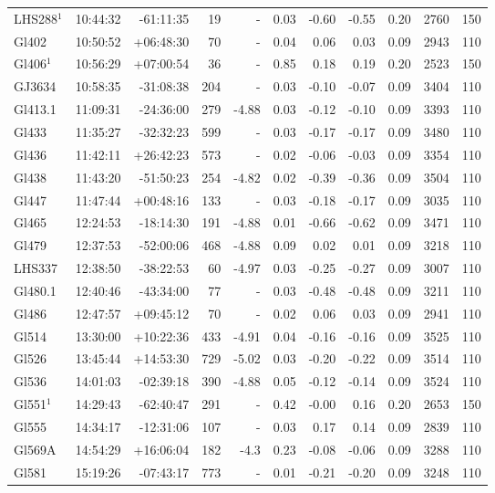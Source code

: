 \documentclass{aa}
\begin{document}
{\begin{longtable}{l r r r r r r r r r r}
LHS288$^1$ & 10:44:32 & -61:11:35 & 19 &    - & 0.03 & -0.60 & -0.55 & 0.20 & 2760 &  150 \\
Gl402 & 10:50:52 & +06:48:30 & 70 &    - & 0.04 & 0.06 & 0.03 & 0.09 & 2943 &  110 \\
Gl406$^1$ & 10:56:29 & +07:00:54 & 36 &    - & 0.85 & 0.18 & 0.19 & 0.20 & 2523 &  150 \\
GJ3634 & 10:58:35 & -31:08:38 & 204 &    - & 0.03 & -0.10 & -0.07 & 0.09 & 3404 &  110 \\
Gl413.1 & 11:09:31 & -24:36:00 & 279 & -4.88 & 0.03 & -0.12 & -0.10 & 0.09 & 3393 &  110 \\
Gl433 & 11:35:27 & -32:32:23 & 599 &    - & 0.03 & -0.17 & -0.17 & 0.09 & 3480 &  110 \\
Gl436 & 11:42:11 & +26:42:23 & 573 &    - & 0.02 & -0.06 & -0.03 & 0.09 & 3354 &  110 \\
Gl438 & 11:43:20 & -51:50:23 & 254 & -4.82 & 0.02 & -0.39 & -0.36 & 0.09 & 3504 &  110 \\
Gl447 & 11:47:44 & +00:48:16 & 133 &    - & 0.03 & -0.18 & -0.17 & 0.09 & 3035 &  110 \\
Gl465 & 12:24:53 & -18:14:30 & 191 & -4.88 & 0.01 & -0.66 & -0.62 & 0.09 & 3471 &  110 \\
Gl479 & 12:37:53 & -52:00:06 & 468 & -4.88 & 0.09 & 0.02 & 0.01 & 0.09 & 3218 &  110 \\
LHS337 & 12:38:50 & -38:22:53 & 60 & -4.97 & 0.03 & -0.25 & -0.27 & 0.09 & 3007 &  110 \\
Gl480.1 & 12:40:46 & -43:34:00 & 77 &    - & 0.03 & -0.48 & -0.48 & 0.09 & 3211 &  110 \\
Gl486 & 12:47:57 & +09:45:12 & 70 &    - & 0.02 & 0.06 & 0.03 & 0.09 & 2941 &  110 \\
Gl514 & 13:30:00 & +10:22:36 & 433 & -4.91 & 0.04 & -0.16 & -0.16 & 0.09 & 3525 &  110 \\
Gl526 & 13:45:44 & +14:53:30 & 729 & -5.02 & 0.03 & -0.20 & -0.22 & 0.09 & 3514 &  110 \\
Gl536 & 14:01:03 & -02:39:18 & 390 & -4.88 & 0.05 & -0.12 & -0.14 & 0.09 & 3524 &  110 \\
Gl551$^1$ & 14:29:43 & -62:40:47 & 291 &    - & 0.42 & -0.00 & 0.16 & 0.20 & 2653 &  150 \\
Gl555 & 14:34:17 & -12:31:06 & 107 &    - & 0.03 & 0.17 & 0.14 & 0.09 & 2839 &  110 \\
Gl569A & 14:54:29 & +16:06:04 & 182 & -4.3 & 0.23 & -0.08 & -0.06 & 0.09 & 3288 &  110 \\
Gl581 & 15:19:26 & -07:43:17 & 773 &    - & 0.01 & -0.21 & -0.20 & 0.09 & 3248 &  110 \\

\end{longtable}}
\end{document}
